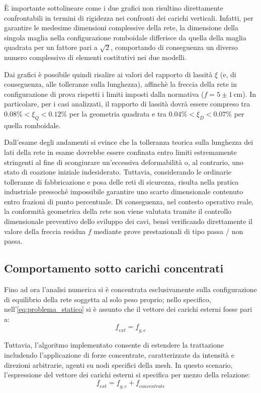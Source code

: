 È importante sottolineare come i due grafici non risultino direttamente confrontabili in termini di rigidezza nei confronti dei carichi verticali. Infatti, per garantire le medesime dimensioni complessive della rete, la dimensione della singola maglia nella configurazione romboidale differisce da quella della maglia quadrata per un fattore pari a $\sqrt{2}$, comportando di conseguenza un diverso numero complessivo di elementi costitutivi nei due modelli.

Dai grafici è possibile quindi risalire ai valori del rapporto di lassità $\xi$ (e, di conseguenza, alle tolleranze sulla lunghezza), affinchè la freccia della rete in configurazione di prova rispetti i limiti imposti dalla normativa ($f = 5 \pm 1\, \text{cm}$). In particolare, per i casi analizzati, il rapporto di lassità dovrà essere compreso tra $ 0.08\% < \xi_{Q} < 0.12\%$ per la geometria quadrata e tra $ 0.04\% < \xi_{D} < 0.07\%$ per quella romboidale.    

Dall'esame degli andamenti si evince che la tolleranza teorica sulla lunghezza dei lati della rete in esame dovrebbe essere confinata entro limiti estremamente stringenti al fine di scongiurare un'eccessiva deformabilità o, al contrario, uno stato di coazione iniziale indesiderato. Tuttavia, considerando le ordinarie tolleranze di fabbricazione e posa delle reti di sicurezza, risulta nella pratica industriale pressoché impossibile garantire uno scarto dimensionale contenuto entro frazioni di punto percentuale. Di conseguenza, nel contesto operativo reale, la conformità geometrica della rete non viene valutata tramite il controllo dimensionale preventivo dello sviluppo dei cavi, bensì verificando direttamente il valore della freccia residua $f$ mediante prove prestazionali di tipo passa / non passa.

\subsection{Comportamento sotto carichi concentrati}
Fino ad ora l'analisi numerica si è concentrata esclusivamente sulla configurazione di equilibrio della rete soggetta al solo peso proprio; nello specifico, nell'\cref{eq:problema_statico} si è assunto che il vettore dei carichi esterni fosse pari a: 
\begin{equation}
   \underline{f}_{ext} = \underline{f}_{g,e}
\end{equation}

Tuttavia, l'algoritmo implementato consente di estendere la trattazione includendo l'applicazione di forze concentrate, caratterizzate da intensità e direzioni arbitrarie, agenti su nodi specifici della mesh. In questo scenario, l'espressione del vettore dei carichi esterni si specifica per mezzo della relazione:
\begin{equation}
   \underline{f}_{ext} = \underline{f}_{g,e} + \underline{f}_{concentrate} 
\end{equation}

